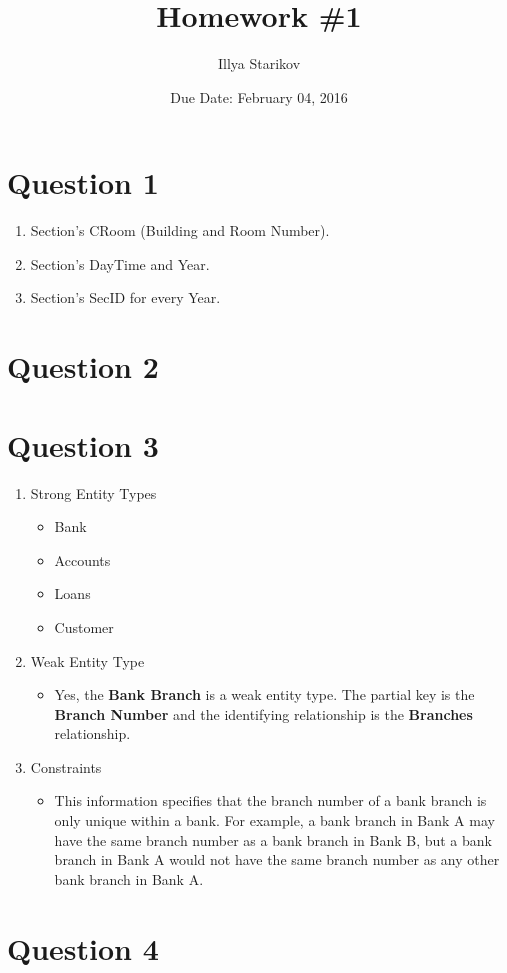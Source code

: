 \documentclass{article}
\begin{document}
\title{Homework \#1}
\author{Illya Starikov}
\date{Due Date: February 04, 2016}

\maketitle

\section*{Question 1}
\begin{enumerate}[label=\alph*]
\item Section's CRoom (Building and Room Number).
\item Section's DayTime and Year.
\item Section's SecID for every Year.
\end{enumerate}

\section*{Question 2}
\begin{center}

\end{center}


\section*{Question 3}
\begin{enumerate}[label=\alph*]
\item Strong Entity Types
    \begin{itemize}
    \item Bank
    \item Accounts
    \item Loans
    \item Customer
    \end{itemize}
\item Weak Entity Type
    \begin{itemize}
    \item Yes, the \textbf{Bank Branch} is a weak entity type. The partial key is the \textbf{Branch Number} and the identifying relationship is the \textbf{Branches} relationship.
    \end{itemize}
\item Constraints
    \begin{itemize}
    \item This information specifies that the branch number of a bank branch is only unique within a bank. For example, a bank branch in Bank A may have the same branch number as a bank branch in Bank B, but a bank branch in Bank A would not have the same branch number as any other bank branch in Bank A.
    \end{itemize}
\end{enumerate}

\section*{Question 4}

\end{document}
